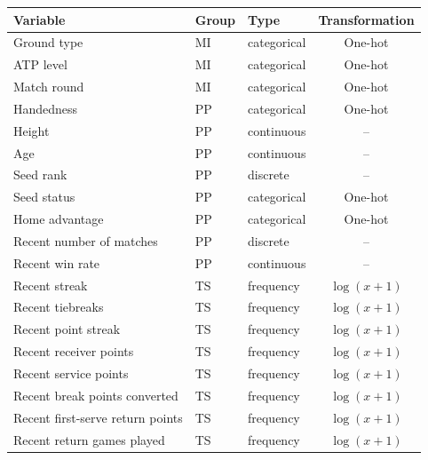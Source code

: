\documentclass[
  12pt]{article}
\begin{document}
\begin{table}[t]
\centering
\scriptsize
\begin{tabular}{lllc}
\toprule
Variable & Group & Type & Transformation \\
\midrule
Ground type                       & MI               & categorical              & One-hot     \\
ATP level                         & MI               & categorical              & One-hot     \\
Match round                       & MI               & categorical              & One-hot     \\
Handedness                        & PP                  & categorical              & One-hot     \\
Height                            & PP                  & continuous   & --          \\
Age                               & PP                  & continuous   & --          \\
Seed rank                         & PP                  & discrete     & --          \\
Seed status                       & PP                  & categorical              & One-hot     \\
Home advantage                    & PP                  & categorical              & One-hot     \\
Recent number of matches                  & PP                  & discrete     & --          \\
Recent win rate                   & PP                  & continuous  & --          \\
Recent streak                     & TS & frequency    & $\log(x+1)$ \\
Recent tiebreaks                  & TS & frequency    & $\log(x+1)$ \\
Recent point streak               & TS & frequency    & $\log(x+1)$ \\
Recent receiver points            & TS & frequency    & $\log(x+1)$ \\
Recent service points             & TS & frequency    & $\log(x+1)$ \\
Recent break points converted     & TS & frequency    & $\log(x+1)$ \\
Recent first-serve return points  & TS & frequency    & $\log(x+1)$ \\
Recent return games played        & TS & frequency    & $\log(x+1)$ \\

\end{tabular}
\end{table}
\end{document}
